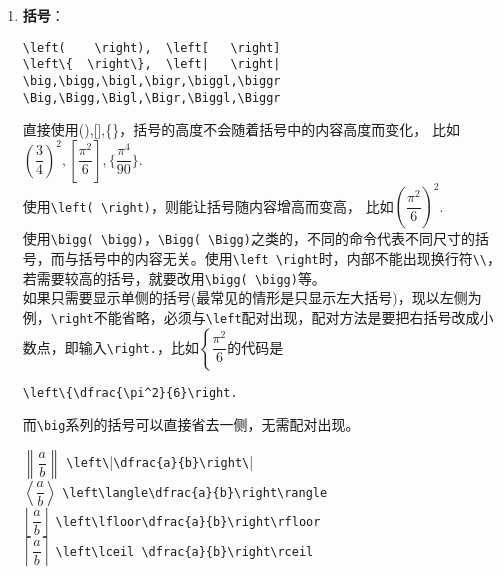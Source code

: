 \documentclass[fontset=windows]{article}
\newcommand{\q}{\quad}
\begin{document}
\begin{multicols}{2}
\begin{enumerate}
\item \textbf{括号}：
\begin{lstlisting}
\left(    \right),  \left[   \right]
\left\{  \right\},  \left|   \right|
\big,\bigg,\bigl,\bigr,\biggl,\biggr 
\Big,\Bigg,\Bigl,\Bigr,\Biggl,\Biggr
\end{lstlisting} 
直接使用(),[],\{\}，括号的高度不会随着括号中的内容高度而变化，
比如$ (\dfrac{3}{4})^2,[\dfrac{\pi^2}{6}],\{\dfrac{\pi^4}{90}\} $.\\
使用\verb|\left( \right)|，则能让括号随内容增高而变高，
比如$ \left(\dfrac{\pi^2}{6}\right)^2 $. \\
使用\verb|\bigg( \bigg)|，\verb|\Bigg( \Bigg)|之类的，不同的命令代表不同尺寸的括号，而与括号中的内容无关。使用\verb|\left \right|时，内部不能出现换行符\verb|\\|，
若需要较高的括号，就要改用\verb|\bigg( \bigg)|等。\\ 
如果只需要显示单侧的括号(最常见的情形是只显示左大括号)，现以左侧为例，\verb|\right|不能省略，必须与\verb|\left|配对出现，配对方法是要把右括号改成小数点，即输入\verb|\right.|，比如$ \left\{\dfrac{\pi^2}{6}\right. $的代码是
\begin{lstlisting}
\left\{\dfrac{\pi^2}{6}\right.    
\end{lstlisting} 
而\verb|\big|系列的括号可以直接省去一侧，无需配对出现。

$ \left\| \dfrac{a}{b} \right\| $\q 
\verb|\left\||\verb|\dfrac{a}{b}\right\|| \\
$ \left\langle \dfrac{a}{b} \right\rangle $\q 
\verb|\left\langle\dfrac{a}{b}\right\rangle| \\
$ \left\lfloor \dfrac{a}{b} \right\rfloor $\q 
\verb|\left\lfloor\dfrac{a}{b}\right\rfloor| \\
$ \left\lceil  \dfrac{a}{b} \right\rceil $\q 
\verb|\left\lceil \dfrac{a}{b}\right\rceil | 



\end{enumerate}
\end{multicols}
\end{document}
